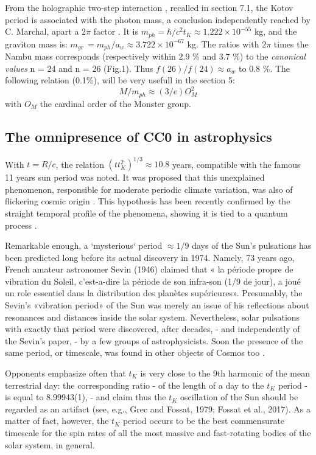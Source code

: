 \documentclass[twoside,draft]{article}
\begin{document}
\begin{sloppypar}
From the holographic two-step interaction \cite{Sanchez1}, recalled in section 7.1, the Kotov period is associated with the photon mass, a conclusion independently reached by C. Marchal, apart a $2\pi$ factor \cite{Marchal}. It is $m_{ph} = \hbar/c^{2} t_{K} \approx 1.222 \times 10^{-55}$ kg, and the graviton mass is: 
$m_{gr}\, = m_{ph} /a_{w} \approx 3.722 \times 10^{-67} $ kg.
The ratios with $2\pi$ times the Nambu mass corresponds (respectively within 2.9 \% and 3.7 \%)  to the \textit{canonical values} n = 24 and n = 26 (Fig.1). Thus $f(26)/f(24) \approx a_w $ to 0.8 \%. The following relation (0.1\%), will be very usefull in the section 5:
\begin{equation}
M/m_{ph} \approx (3/e)O^2_M
\end{equation}
with $O_M$ the cardinal order of the Monster group\cite{Aschbacher}.

\subsection{The omnipresence of CC0 in astrophysics}

With $t = R/c$, the relation $(t t_{K}^2)^{1/3} \approx 10.8$ years, compatible with the famous 11 years sun period was noted. It was proposed that this unexplained phenomenon, responsible for moderate periodic climate variation, was also of flickering cosmic origin \cite{Sanchez3}. This hypothesis has been recently confirmed by the straight temporal profile of the phenomena, showing it is tied to a quantum process \cite{Kotov2}.

Remarkable enough, a `mysterious` period $\approx 1/9$ days of the Sun's pulsations has been predicted long before its actual discovery in 1974. Namely, 73 years ago, French amateur astronomer Sevin (1946) claimed that « la p\'{e}riode propre de vibration du Soleil, c'est-a-dire la p\'{e}riode de son infra-son (1/9 de jour), a jou\'{e} un role essentiel dans la distribution des plan\`{e}tes sup\'{e}rieures». Presumably, the Sevin's «vibration period» of the Sun was merely an issue of his reflections about resonances and distances inside the solar system. Nevertheless, solar pulsations with exactly that period were discovered, after decades, - and independently of the Sevin's paper, - by a few groups of astrophysicists. Soon the presence of the same period, or timescale, was found in other objects of Cosmos too \cite{Kotov1}.

Opponents emphasize often that $t_{K}$ is very close to the 9th harmonic of the mean terrestrial day: the corresponding ratio - of the length of a day to the $t_{K}$ period - is equal to 8.99943(1), - and claim thus the $t_{K}$ oscillation of the Sun should be regarded as an artifact (see, e.g., Grec and Fossat, 1979; Fossat et al., 2017). As a matter of fact, however, the $t_{K}$ period occurs to be the best commensurate timescale for the spin rates of all the most massive and fast-rotating bodies of the solar system, in general.


\end{sloppypar}
\end{document}

